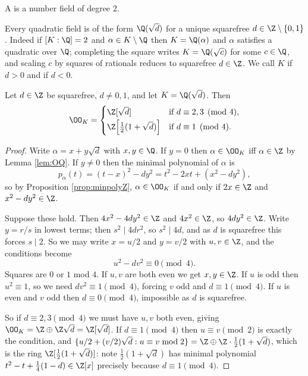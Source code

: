 \begin{definition}
	A  is a number field of degree $2$.
\end{definition}

Every quadratic field is of the form $\Q(\sqrt{d})$ for a unique squarefree $d \in \Z \setminus \{0,1\}$. Indeed if $[K:\Q] = 2$ and $\alpha \in K \setminus \Q$ then $K = \Q(\alpha)$ and $\alpha$ satisfies a quadratic over $\Q$; completing the square writes $K = \Q(\sqrt{c})$ for some $c \in \Q$, and scaling $c$ by squares of rationals reduces to squarefree $d \in \Z$. We call $K$  if $d > 0$ and  if $d < 0$.

\begin{lemma}\label{lem:quadOK}
	Let $d \in \Z$ be squarefree, $d \neq 0, 1$, and let $K = \Q(\sqrt d)$. Then
	$$\OO_K = \begin{cases} \Z[\sqrt d] & \text{if } d \equiv 2, 3 \pmod 4,\\[2pt] \Z\!\left[\tfrac{1}{2}(1+\sqrt d)\right] & \text{if } d \equiv 1 \pmod 4.\end{cases}$$
\end{lemma}

\begin{proof}
	Write $\alpha = x + y\sqrt d$ with $x, y \in \Q$. If $y = 0$ then $\alpha \in \OO_K$ iff $\alpha \in \Z$ by Lemma \ref{lem:OQ}. If $y \neq 0$ then the minimal polynomial of $\alpha$ is
	$$p_\alpha(t) = (t - x)^2 - dy^2 = t^2 - 2xt + (x^2 - dy^2),$$
	so by Proposition \ref{prop:minpolyZ}, $\alpha \in \OO_K$ if and only if $2x \in \Z$ and $x^2 - dy^2 \in \Z$.

	Suppose these hold. Then $4x^2 - 4dy^2 \in \Z$ and $4x^2 \in \Z$, so $4dy^2 \in \Z$. Write $y = r/s$ in lowest terms; then $s^2 \mid 4dr^2$, so $s^2 \mid 4d$, and as $d$ is squarefree this forces $s \mid 2$. So we may write $x = u/2$ and $y = v/2$ with $u, v \in \Z$, and the conditions become
	$$u^2 - dv^2 \equiv 0 \pmod 4.$$
	Squares are $0$ or $1$ mod $4$. If $u, v$ are both even we get $x, y \in \Z$. If $u$ is odd then $u^2 \equiv 1$, so we need $dv^2 \equiv 1 \pmod 4$, forcing $v$ odd and $d \equiv 1 \pmod 4$. If $u$ is even and $v$ odd then $d \equiv 0 \pmod 4$, impossible as $d$ is squarefree.

	So if $d \equiv 2, 3 \pmod 4$ we must have $u, v$ both even, giving $\OO_K = \Z \oplus \Z\sqrt d = \Z[\sqrt d]$. If $d \equiv 1 \pmod 4$ then $u \equiv v \pmod 2$ is exactly the condition, and $\{u/2 + (v/2)\sqrt d : u \equiv v \bmod 2\} = \Z \oplus \Z\cdot\tfrac12(1+\sqrt d)$, which is the ring $\Z[\tfrac12(1+\sqrt d)]$: note $\tfrac12(1+\sqrt d)$ has minimal polynomial $t^2 - t + \tfrac14(1-d) \in \Z[x]$ precisely because $d \equiv 1 \pmod 4$.
\end{proof}

